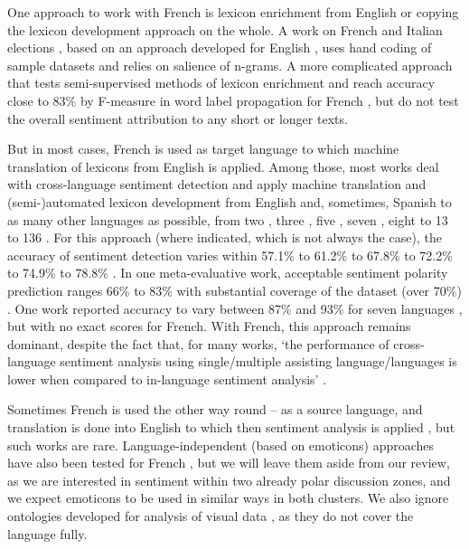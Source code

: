 One approach to work with French is lexicon enrichment from English or copying the lexicon development approach on the whole. A work on French and Italian elections \cite{CeronCuriniIacus}, based on an approach developed for English \cite{KingHopkins}, uses hand coding of sample datasets and relies on salience of n-grams. A more complicated approach that tests semi-supervised methods of lexicon enrichment and reach accuracy close to 83\% by F-measure in word label propagation for French \cite{RaoRavichandran}, but do not test the overall sentiment attribution to any short or longer texts.

But in most cases, French is used as target language to which machine translation of lexicons from English is applied. Among those, most works deal with cross-language sentiment detection and apply machine translation and (semi-)automated lexicon development from English and, sometimes, Spanish to as many other languages as possible, from two \cite{RaoRavichandran}, three \cite{BalahurTurchi,BaderKegelmeyerChew}, five \cite{BautinVijayarenuSkiena}, seven \cite{SteinbergerEbrahimEhrmann}, eight \cite{RuderGhaffariBreslin} to 13 \cite{SteinbergerLenkovaKabadjov} to 136 \cite{ChenSkiena}. For this approach (where indicated, which is not always the case), the accuracy of sentiment detection varies within 57.1\% to 61.2\% \cite{BalahurTurchi} to 67.8\% \cite{BoiyMoens} to 72.2\% \cite{KumarKohailKumar} to 74.9\% \cite{BaderKegelmeyerChew} to 78.8\% \cite{RuderGhaffariBreslin}. In one meta-evaluative work, acceptable sentiment polarity prediction ranges 66\% to 83\% with substantial coverage of the dataset (over 70\%) \cite{AraujoReisPereira}. One work reported accuracy to vary between 87\% and 93\% for seven languages \cite{NeriAliprandiCapeci}, but with no exact scores for French. With French, this approach remains dominant, despite the fact that, for many works, ‘the performance of cross-language sentiment analysis using single/multiple assisting language/languages is lower when compared to in-language sentiment analysis’ \cite[p.~8]{BalamuraliKhapraBhattacharyya}.

Sometimes French is used the other way round -- as a source language, and translation is done into English to which then sentiment analysis is applied \cite{Denecke}, but such works are rare. Language-independent (based on emoticons) approaches have also been tested for French \cite{NarrHulfenhausAlbayrak}, but we will leave them aside from our review, as we are interested in sentiment within two already polar discussion zones, and we expect emoticons to be used in similar ways in both clusters. We also ignore ontologies developed for analysis of visual data \cite{JouChenPappas}, as they do not cover the language fully.


